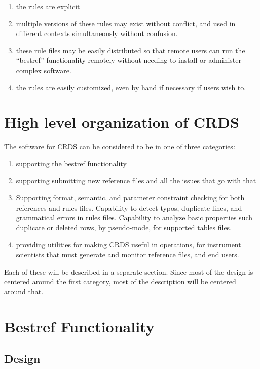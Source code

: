 \documentclass[final,authoryear,5p,times,twocolumn]{elsarticle}
\begin{document}
\begin{enumerate}
\item the rules are explicit
\item multiple versions of these rules may exist without conflict, and used in
different contexts simultaneously without confusion.
\item these rule files may be easily distributed so that remote users can run the
``bestref'' functionality remotely without needing to install or administer
complex software.
\item the rules are easily customized, even by hand if necessary if
users wish to.
\end{enumerate}

\section{High level organization of CRDS}

The software for CRDS can be considered to be in one of three categories:

\begin{enumerate}
\item supporting the bestref functionality
\item supporting submitting new reference files and all the issues that
go with that
\item Supporting format, semantic, and parameter constraint checking for both
references and rules files.  Capability to detect typos, duplicate lines, and
grammatical errors in rules files.   Capability to analyze basic properties
such duplicate or deleted rows,  by pseudo-mode, for supported tables files.
\item providing utilities for making CRDS useful in operations, for instrument
scientists that must generate and monitor reference files, and end users.
\end{enumerate}

Each of these will be described in a separate section. Since most of the design
is centered around the first category, most of the description will be centered
around that.

\section{Bestref Functionality}

\subsection{Design}
\end{document}
